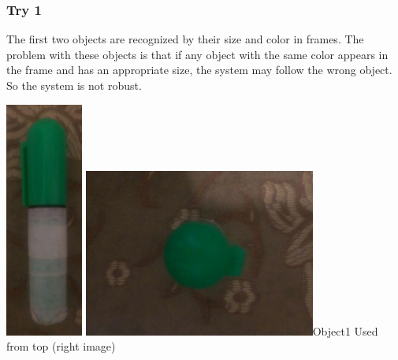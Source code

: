 \documentclass{report}
\begin{document}
\subsubsection{Try 1}
The first two objects are recognized by their size and color in frames. The problem with these objects is that if any object with the same color appears in the frame and has an appropriate size, the system may follow the wrong object. So the system is not robust. \newline
\begin{center}
\includegraphics[width=1in]{Object1.jpg}
\includegraphics[width=3in]{Object1-2.jpg}\newline \figurename{Object1} Used from top (right image)	
\end{center}
\end{document}
